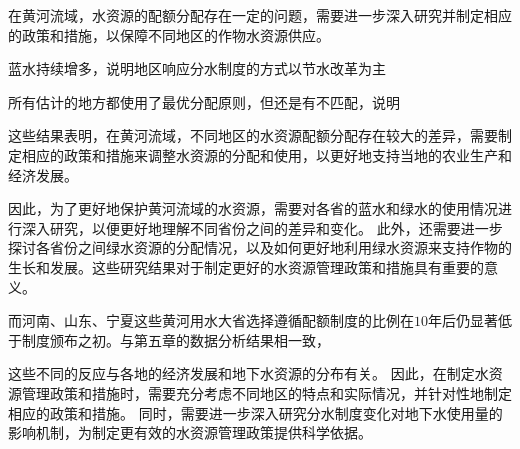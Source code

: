 在黄河流域，水资源的配额分配存在一定的问题，需要进一步深入研究并制定相应的政策和措施，以保障不同地区的作物水资源供应。

蓝水持续增多，说明地区响应分水制度的方式以节水改革为主

所有估计的地方都使用了最优分配原则，但还是有不匹配，说明

这些结果表明，在黄河流域，不同地区的水资源配额分配存在较大的差异，需要制定相应的政策和措施来调整水资源的分配和使用，以更好地支持当地的农业生产和经济发展。

因此，为了更好地保护黄河流域的水资源，需要对各省的蓝水和绿水的使用情况进行深入研究，以便更好地理解不同省份之间的差异和变化。
此外，还需要进一步探讨各省份之间绿水资源的分配情况，以及如何更好地利用绿水资源来支持作物的生长和发展。这些研究结果对于制定更好的水资源管理政策和措施具有重要的意义。

而河南、山东、宁夏这些黄河用水大省选择遵循配额制度的比例在$10$年后仍显著低于制度颁布之初。与第五章的数据分析结果相一致，

这些不同的反应与各地的经济发展和地下水资源的分布有关。
因此，在制定水资源管理政策和措施时，需要充分考虑不同地区的特点和实际情况，并针对性地制定相应的政策和措施。
同时，需要进一步深入研究分水制度变化对地下水使用量的影响机制，为制定更有效的水资源管理政策提供科学依据。